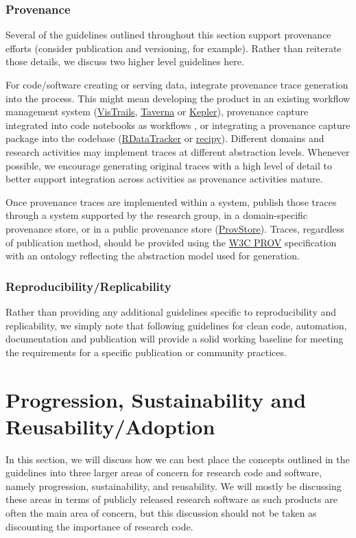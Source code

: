 \documentclass{article}
\begin{document}
\subsubsection{Provenance}
Several of the guidelines outlined throughout this section support provenance efforts (consider publication and versioning, for example). Rather than reiterate those details, we discuss two higher level guidelines here.
 
For code/software creating or serving data, integrate provenance trace generation into the process. This might mean developing the product in an existing workflow management system (\href{https://www.vistrails.org/index.php/Main_Page} {VisTrails}, \href{http://www.taverna.org.uk/} {Taverna} or \href{https://kepler-project.org/} {Kepler}), provenance capture integrated into code notebooks as workflows \autocite{ma_documenting_2017, _eco-op_2015}, or integrating a provenance capture package into the codebase (\href{https://github.com/End-to-end-provenance/RDataTracker} {RDataTracker} or \href{https://github.com/recipy/recipy} {recipy}). Different domains and research activities may implement traces at different abstraction levels. Whenever possible, we encourage generating original traces with a high level of detail to better support integration across activities as provenance activities mature.
 
Once provenance traces are implemented within a system, publish those traces through a system supported by the research group, in a domain-specific provenance store, or in a public provenance store (\href{https://provenance.ecs.soton.ac.uk/store/} {ProvStore}). Traces, regardless of publication method, should be provided using the \href{https://www.w3.org/TR/prov-overview/} {W3C PROV} specification with an ontology reflecting the abstraction model used for generation.

\subsubsection{Reproducibility/Replicability}
Rather than providing any additional guidelines specific to reproducibility and replicability, we simply note that following guidelines for clean code, automation, documentation and publication will provide a solid working baseline for meeting the requirements for a specific publication or community practices.

\section{Progression, Sustainability and Reusability/Adoption}
In this section, we will discuss how we can best place the concepts outlined in the guidelines into three larger areas of concern for research code and software, namely progression, sustainability, and reusability. We will mostly be discussing these areas in terms of publicly released research software as such products are often the main area of concern, but this discussion should not be taken as discounting the importance of research code.
 
\end{document}
